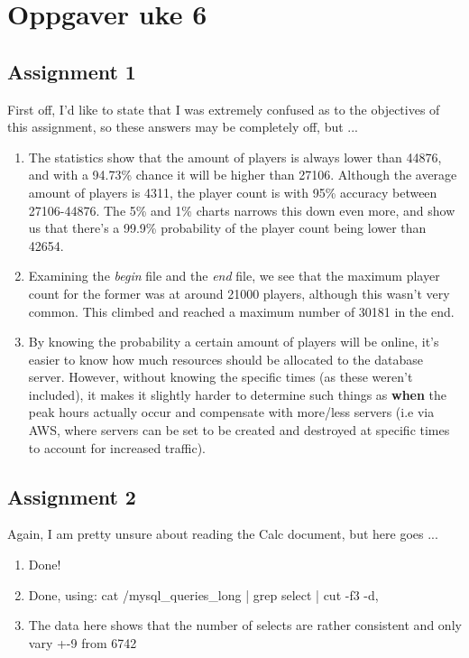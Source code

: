 \section{Oppgaver uke 6}

\subsection{Assignment 1} 

First off, I'd like to state that I was extremely confused as to the objectives of this assignment, so these answers may be completely off, but ...

\begin{enumerate}
	\item The statistics show that the amount of players is always lower than 44876, and with a 94.73\% chance it will be higher than 27106. Although the average amount of players is 4311, the player count is with 95\% accuracy between 27106-44876. The 5\% and 1\% charts narrows this down even more, and show us that there's a 99.9\% probability of the player count being lower than 42654. 
	\item Examining the \textit{begin} file and the \textit{end} file, we see that the maximum player count for the former was at around 21000 players, although this wasn't very common. This climbed and reached a maximum number of 30181 in the end.
	\item By knowing the probability a certain amount of players will be online, it's easier to know how much resources should be allocated to the database server. However, without knowing the specific times (as these weren't included), it makes it slightly harder to determine such things as \textbf{when} the peak hours actually occur and compensate with more/less servers (i.e via AWS, where servers can be set to be created and destroyed at specific times to account for increased traffic).
	
\end{enumerate}

\subsection{Assignment 2}

Again, I am pretty unsure about reading the Calc document, but here goes ...
\begin{enumerate}
	\item Done!
	\item Done, using: cat /mysql\_queries\_long | grep select | cut -f3 -d, 
	\item The data here shows that the number of selects are rather consistent and only vary +-9 from 6742
\end{enumerate}

